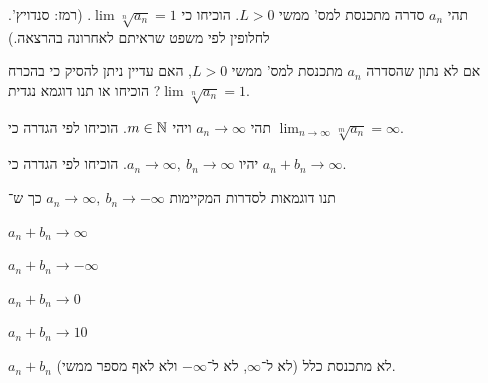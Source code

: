 \documentclass{infi-ex}
\begin{document}
\begin{question}
\begin{parts}
  \item תהי $a_n$ סדרה מתכנסת למס' ממשי $L>0$. הוכיחו כי $\lim\sqrt[n]{a_n}=1$. (רמז: סנדויץ'. לחלופין לפי משפט שראיתם לאחרונה בהרצאה.)
  \item אם לא נתון שהסדרה $a_n$ מתכנסת למס' ממשי $L>0$, האם עדיין ניתן להסיק כי בהכרח $\lim\sqrt[n]{a_n}=1$? הוכיחו או תנו דוגמא נגדית.
\end{parts}
\end{question}

\begin{question}
\begin{parts}
  \item תהי $a_n\to\infty$ ויהי $m\in\mathbb{N}$. הוכיחו לפי הגדרה כי $\lim_{n\to\infty}\sqrt[m]{a_n}=\infty$.
  \item יהיו $a_n\to\infty,\ b_n\to\infty$. הוכיחו לפי הגדרה כי $a_n+b_n\to\infty$.
\end{parts}
\end{question}

\begin{question}
תנו דוגמאות לסדרות המקיימות $a_n\to\infty,\ b_n\to-\infty$ כך ש־
\begin{parts}
  \item $a_n+b_n\to\infty$
  \item $a_n+b_n\to-\infty$
  \item $a_n+b_n\to0$
  \item $a_n+b_n\to10$
  \item $a_n+b_n$ לא מתכנסת כלל (לא ל־$\infty$, לא ל־$-\infty$ ולא לאף מספר ממשי).
\end{parts}
\end{question}
\end{document}
